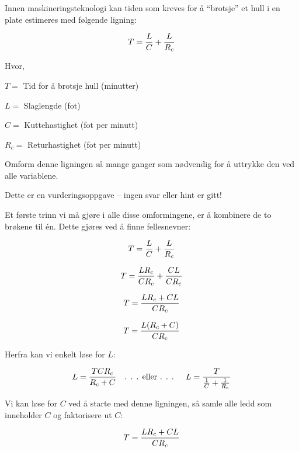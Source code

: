 

Innen maskineringsteknologi kan tiden som kreves for å ``brotsje'' et hull i en plate estimeres med følgende ligning:

$$T = {L \over C} + {L \over R_c}$$

\noindent
Hvor,

$T =$ Tid for å brotsje hull (minutter)

$L =$ Slaglengde (fot)

$C =$ Kuttehastighet (fot per minutt)

$R_c =$ Returhastighet (fot per minutt)

\vskip 10pt

Omform denne ligningen så mange ganger som nødvendig for å uttrykke den ved alle variablene.

\vfil

\eject






Dette er en vurderingsoppgave -- ingen svar eller hint er gitt!







Et første trinn vi må gjøre i alle disse omformingene, er å kombinere de to brøkene til én. Dette gjøres ved å finne fellesnevner:

$$T = {L \over C} + {L \over R_c}$$

$$T = {L R_c \over C R_c} + {C L \over C R_c}$$

$$T = {{L R_c + C L} \over C R_c}$$

$$T = {{L (R_c + C)} \over C R_c}$$

Herfra kan vi enkelt løse for $L$:

$$L = {{T C R_c} \over {R_c + C}} \hbox{\hskip 10pt . . . eller . . . \hskip 10pt} L = {T \over {{1 \over C} + {1 \over R_c}}} $$

\vskip 20pt

Vi kan løse for $C$ ved å starte med denne ligningen, så samle alle ledd som inneholder $C$ og faktorisere ut $C$:

$$T = {{L R_c + C L} \over C R_c}$$

